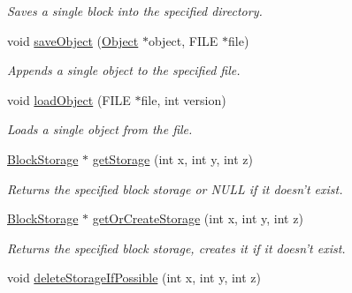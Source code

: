 \begin{DoxyCompactItemize}
\begin{DoxyCompactList}\small\item\em \-Saves a single block into the specified directory. \end{DoxyCompactList}\item 
\hypertarget{classGameDataStorage_a0c60a9b6af1d7d30f365ee21ba838c5a}{
void \hyperlink{classGameDataStorage_a0c60a9b6af1d7d30f365ee21ba838c5a}{save\-Object} (\hyperlink{classObject}{\-Object} $\ast$object, \-F\-I\-L\-E $\ast$file)}
\label{dc/d0b/classGameDataStorage_a0c60a9b6af1d7d30f365ee21ba838c5a}

\begin{DoxyCompactList}\small\item\em \-Appends a single object to the specified file. \end{DoxyCompactList}\item 
\hypertarget{classGameDataStorage_aab2ffaa4a5c54e295af7c38a6fc0b4f6}{
void \hyperlink{classGameDataStorage_aab2ffaa4a5c54e295af7c38a6fc0b4f6}{load\-Object} (\-F\-I\-L\-E $\ast$file, int version)}
\label{dc/d0b/classGameDataStorage_aab2ffaa4a5c54e295af7c38a6fc0b4f6}

\begin{DoxyCompactList}\small\item\em \-Loads a single object from the file. \end{DoxyCompactList}\item 
\hypertarget{classGameDataStorage_addee198c86b81b436e54206c2af90479}{
\hyperlink{structBlockStorage}{\-Block\-Storage} $\ast$ \hyperlink{classGameDataStorage_addee198c86b81b436e54206c2af90479}{get\-Storage} (int x, int y, int z)}
\label{dc/d0b/classGameDataStorage_addee198c86b81b436e54206c2af90479}

\begin{DoxyCompactList}\small\item\em \-Returns the specified block storage or \-N\-U\-L\-L if it doesn't exist. \end{DoxyCompactList}\item 
\hypertarget{classGameDataStorage_ac9999e8b553bfcf27161aa5ff4712aea}{
\hyperlink{structBlockStorage}{\-Block\-Storage} $\ast$ \hyperlink{classGameDataStorage_ac9999e8b553bfcf27161aa5ff4712aea}{get\-Or\-Create\-Storage} (int x, int y, int z)}
\label{dc/d0b/classGameDataStorage_ac9999e8b553bfcf27161aa5ff4712aea}

\begin{DoxyCompactList}\small\item\em \-Returns the specified block storage, creates it if it doesn't exist. \end{DoxyCompactList}\item 
\hypertarget{classGameDataStorage_a3c596a8068ad9844987cbd0cdfade3f8}{
void \hyperlink{classGameDataStorage_a3c596a8068ad9844987cbd0cdfade3f8}{delete\-Storage\-If\-Possible} (int x, int y, int z)}
\label{dc/d0b/classGameDataStorage_a3c596a8068ad9844987cbd0cdfade3f8}


\end{DoxyCompactItemize}
